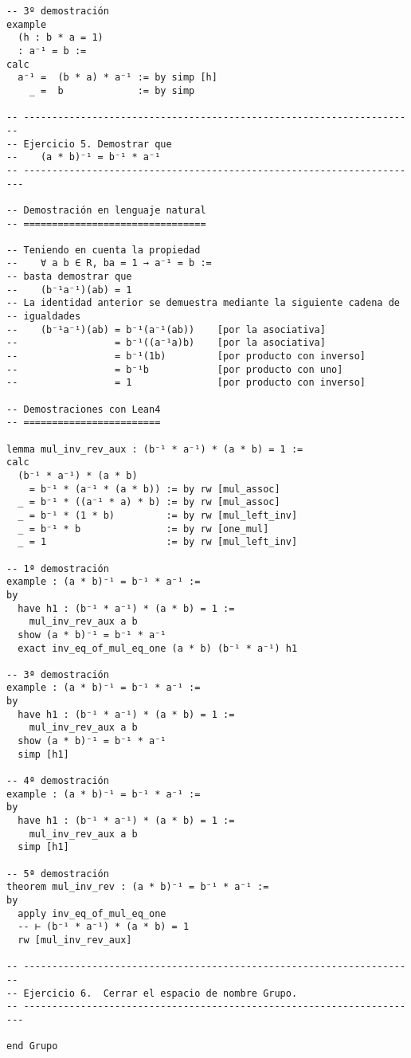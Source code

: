 \begin{verbatim}
-- 3º demostración
example
  (h : b * a = 1)
  : a⁻¹ = b :=
calc
  a⁻¹ =  (b * a) * a⁻¹ := by simp [h]
    _ =  b             := by simp

-- ---------------------------------------------------------------------
-- Ejercicio 5. Demostrar que
--    (a * b)⁻¹ = b⁻¹ * a⁻¹
-- ----------------------------------------------------------------------

-- Demostración en lenguaje natural
-- ================================

-- Teniendo en cuenta la propiedad
--    ∀ a b ∈ R, ba = 1 → a⁻¹ = b :=
-- basta demostrar que
--    (b⁻¹a⁻¹)(ab) = 1
-- La identidad anterior se demuestra mediante la siguiente cadena de
-- igualdades
--    (b⁻¹a⁻¹)(ab) = b⁻¹(a⁻¹(ab))    [por la asociativa]
--                 = b⁻¹((a⁻¹a)b)    [por la asociativa]
--                 = b⁻¹(1b)         [por producto con inverso]
--                 = b⁻¹b            [por producto con uno]
--                 = 1               [por producto con inverso]

-- Demostraciones con Lean4
-- ========================

lemma mul_inv_rev_aux : (b⁻¹ * a⁻¹) * (a * b) = 1 :=
calc
  (b⁻¹ * a⁻¹) * (a * b)
    = b⁻¹ * (a⁻¹ * (a * b)) := by rw [mul_assoc]
  _ = b⁻¹ * ((a⁻¹ * a) * b) := by rw [mul_assoc]
  _ = b⁻¹ * (1 * b)         := by rw [mul_left_inv]
  _ = b⁻¹ * b               := by rw [one_mul]
  _ = 1                     := by rw [mul_left_inv]

-- 1ª demostración
example : (a * b)⁻¹ = b⁻¹ * a⁻¹ :=
by
  have h1 : (b⁻¹ * a⁻¹) * (a * b) = 1 :=
    mul_inv_rev_aux a b
  show (a * b)⁻¹ = b⁻¹ * a⁻¹
  exact inv_eq_of_mul_eq_one (a * b) (b⁻¹ * a⁻¹) h1

-- 3ª demostración
example : (a * b)⁻¹ = b⁻¹ * a⁻¹ :=
by
  have h1 : (b⁻¹ * a⁻¹) * (a * b) = 1 :=
    mul_inv_rev_aux a b
  show (a * b)⁻¹ = b⁻¹ * a⁻¹
  simp [h1]

-- 4ª demostración
example : (a * b)⁻¹ = b⁻¹ * a⁻¹ :=
by
  have h1 : (b⁻¹ * a⁻¹) * (a * b) = 1 :=
    mul_inv_rev_aux a b
  simp [h1]

-- 5ª demostración
theorem mul_inv_rev : (a * b)⁻¹ = b⁻¹ * a⁻¹ :=
by
  apply inv_eq_of_mul_eq_one
  -- ⊢ (b⁻¹ * a⁻¹) * (a * b) = 1
  rw [mul_inv_rev_aux]

-- ---------------------------------------------------------------------
-- Ejercicio 6.  Cerrar el espacio de nombre Grupo.
-- ----------------------------------------------------------------------

end Grupo
\end{verbatim}

